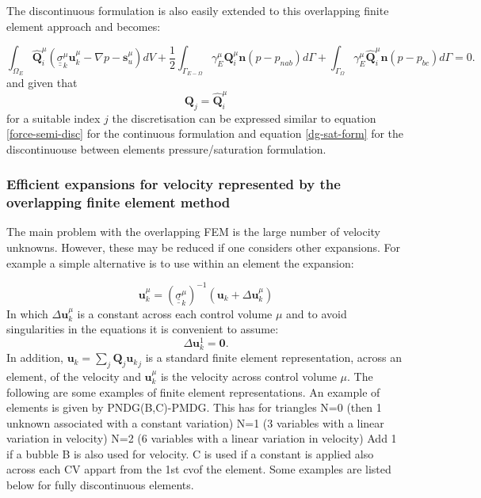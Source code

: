 The discontinuous formulation is also easily extended 
to this overlapping finite element approach and becomes: 

\begin{equation}
\int_{\Omega_E} \hat{\mathbf Q}_i^\mu ({\underline{\underline{\sigma}}}_k^\mu {\mathbf u}_k^\mu - \nabla p -{\mathbf s}_u^\mu) dV 
+  \frac{1}{2}\int_{\Gamma_{E-\Omega}} \gamma^\mu_E {\mathbf Q}_i^\mu {\mathbf n} (p - p_{nab}) d\Gamma 
+  \int_{\Gamma_{\Omega}}  \gamma^\mu_E \hat{\mathbf Q}_i^\mu {\mathbf n} (p - p_{bc}) d\Gamma =0. 
\label{overlap-eqn-dg}
\end{equation}
and given that 
\begin{equation}
{\mathbf Q}_j=\hat{\mathbf Q}_i^\mu 
\end{equation}
for a suitable index $j$ the discretisation can be expressed 
similar to equation \ref{force-semi-disc} for the continuous formulation and 
equation \ref{dg-sat-form} for the discontinuouse 
between elements pressure/saturation formulation. 


\subsubsection{Efficient expansions for velocity represented by the overlapping finite element method}  
The main problem with the overlapping FEM is the large number of velocity unknowns. 
However, these may be reduced if one considers other expansions. 
For example a simple alternative is to use within an element the expansion:

\begin{equation}
 {\mathbf u}_k^\mu = ({\underline{\underline{\sigma}}}_k^\mu)^{-1}  ({\mathbf u}_k + \Delta{\mathbf u}_k^\mu)
\end{equation}
In which $\Delta{\mathbf u}_k^\mu$ is a constant across each control volume $\mu$ and to avoid singularities 
in the equations it is convenient to assume:  
\begin{equation}
\Delta{\mathbf u}_k^1={\mathbf 0}. 
\end{equation}
In addition, 
${\mathbf u}_k =\sum_j {\mathbf Q}_j {{\mathbf u}_k}_j$ is a 
standard finite element representation, across an element, of the 
velocity and ${\mathbf u}_k^\mu$ is the velocity across control volume $\mu$. 
The following are some examples of finite element representations. 
An example of elements is given by 
PNDG(B,C)-PMDG. 
This has for triangles 
N=0 (then 1 unknown associated with a constant variation)
N=1 (3 variables with a linear variation in velocity)
N=2 (6 variables with a linear variation in velocity)
Add 1 if a bubble B is also used for velocity. 
C is used if a constant is applied also across each CV appart from the 1st cvof the element. 
Some examples are listed below for fully discontinuous elements.

